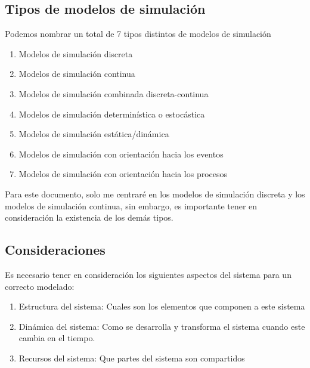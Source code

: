\subsection*{Tipos de modelos de simulación}
Podemos nombrar un total de 7 tipos distintos de modelos de simulación

\begin{enumerate}
    \item Modelos de simulación discreta
    \item Modelos de simulación continua
    \item Modelos de simulación combinada discreta-continua
    \item Modelos de simulación determinística o estocástica
    \item Modelos de simulación estática/dinámica
    \item Modelos de simulación con orientación hacia los eventos
    \item Modelos de simulación con orientación hacia los procesos
\end{enumerate}

Para este documento, solo me centraré en los modelos de simulación discreta y los modelos de simulación continua, sin embargo, es importante tener en consideración la existencia de los demás tipos.

\subsection*{Consideraciones}
Es necesario tener en consideración los siguientes aspectos del sistema para un correcto modelado:

\begin{enumerate}
    \item Estructura del sistema: Cuales son los elementos que componen a este sistema
    \item Dinámica del sistema: Como se desarrolla y transforma el sistema cuando este cambia en el tiempo.
    \item Recursos del sistema: Que partes del sistema son compartidos
\end{enumerate}